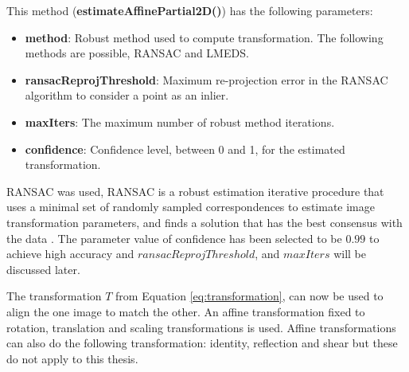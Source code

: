 This method (\textbf{estimateAffinePartial2D()}) has the following parameters:
\begin{itemize}
\item \textbf{method}:	Robust method used to compute transformation. The following methods are possible, RANSAC and LMEDS.
\item \textbf{ransacReprojThreshold}:  Maximum re-projection error in the RANSAC algorithm to consider a point as an inlier.
\item \textbf{maxIters}: The maximum number of robust method iterations.
\item \textbf{confidence}: Confidence level, between 0 and 1, for the estimated transformation.
\end{itemize}

RANSAC was used, RANSAC is a robust estimation iterative procedure that uses a minimal set of randomly sampled correspondences to estimate image transformation parameters, and finds a solution that has the best consensus with the data \cite{Fischler1981}. The parameter value of confidence has been selected to be $0.99$ to achieve high accuracy and $ransacReprojThreshold$, and $maxIters$ will be discussed later.

The transformation $T$ from Equation \ref{eq:transformation}, can now be used to align the one image to match the other. An affine transformation fixed to rotation, translation and scaling transformations is used. Affine transformations can also do the following transformation: identity, reflection and shear but these do not apply to this thesis.



